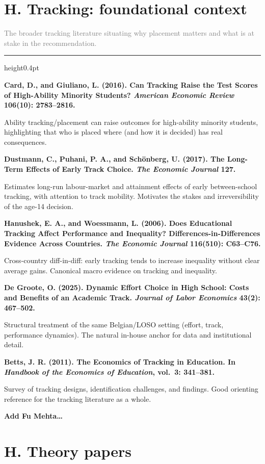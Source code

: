 \documentclass[11pt]{article}
\newcommand{\entry}[3]{%
  \par\medskip\noindent\textbf{#1}\par
  \nopagebreak #2\hspace{0.35em}{\small\color{tagcol}[#3]}\par}
\newcommand{\note}[1]{\par\smallskip\noindent\hangindent=1.3em
  \textcolor{notecol}{\footnotesize$\hookrightarrow$~\textit{#1}}}
\newcommand{\secintro}[1]{\par\smallskip\noindent\textcolor{grey}{\small #1}\par
  \vspace{2pt}\hrule height0.4pt\vspace{4pt}}
\begin{document}
\section{H. Tracking: foundational context}
\secintro{The broader tracking literature situating why placement matters and what is at
stake in the recommendation.}

\entry{Card, D., and Giuliano, L. (2016). Can Tracking Raise the Test Scores of
High-Ability Minority Students? \textit{American Economic Review} 106(10): 2783--2816.}
{Ability tracking/placement can raise outcomes for high-ability minority students,
highlighting that who is placed where (and how it is decided) has real consequences.}{RF}

\entry{Dustmann, C., Puhani, P. A., and Sch\"onberg, U. (2017). The Long-Term Effects of
Early Track Choice. \textit{The Economic Journal} 127.}
{Estimates long-run labour-market and attainment effects of early between-school tracking,
with attention to track mobility. Motivates the stakes and irreversibility of the age-14
decision.}{RF}

\entry{Hanushek, E. A., and Woessmann, L. (2006). Does Educational Tracking Affect
Performance and Inequality? Differences-in-Differences Evidence Across Countries.
\textit{The Economic Journal} 116(510): C63--C76.}
{Cross-country diff-in-diff: early tracking tends to increase inequality without clear
average gains. Canonical macro evidence on tracking and inequality.}{RF}

\entry{De Groote, O. (2025). Dynamic Effort Choice in High School: Costs and Benefits of
an Academic Track. \textit{Journal of Labor Economics} 43(2): 467--502.}
{Structural treatment of the same Belgian/LOSO setting (effort, track, performance
dynamics). The natural in-house anchor for data and institutional detail.}{STR}

\entry{Betts, J. R. (2011). The Economics of Tracking in Education. In \textit{Handbook
of the Economics of Education}, vol.\ 3: 341--381.}
{Survey of tracking designs, identification challenges, and findings. Good orienting
reference for the tracking literature as a whole.}{REV}

\textbf{Add Fu Mehta\dots}


\section{H. Theory papers}
\end{document}

